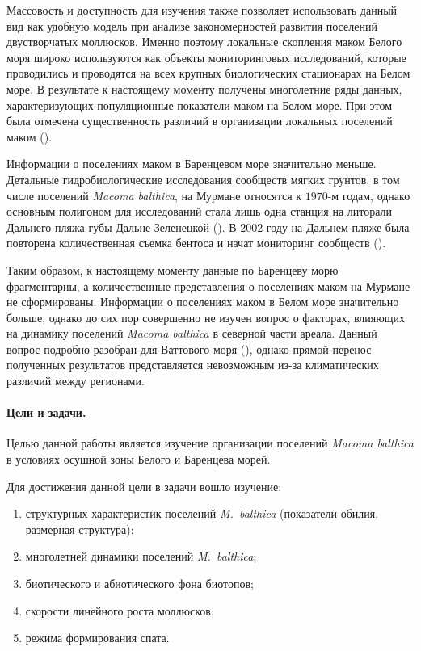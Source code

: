 Массовость и доступность для изучения также позволяет использовать данный вид как удобную модель при анализе закономерностей развития поселений двустворчатых моллюсков. 
Именно поэтому локальные скопления маком Белого моря широко используются как объекты мониторинговых исследований, которые проводились и проводятся на всех крупных биологических стационарах на Белом море. 
В результате к настоящему моменту получены многолетние ряды данных, характеризующих  популяционные показатели маком на Белом море. 
При этом была отмечена существенность различий в организации локальных поселений маком (\cite{Semenova_1974, Maximovich_Kunina_1982, Maximovich_et_al_1991, Poloskin_1996, Nikolaeva_1998, Nazarova_2003, Nazarova_Poloskin_2005}).

 
Информации о поселениях маком в Баренцевом море значительно меньше. 
Детальные гидробиологические исследования сообществ мягких грунтов, в том числе  поселений {\it Macoma balthica}, на Мурмане относятся к $1970$-м годам, однако основным полигоном для исследований стала лишь одна станция на литорали Дальнего пляжа губы Дальне-Зеленецкой (\cite{Agarova_et_al_1976}).
В $2002$ году на Дальнем пляже была повторена количественная съемка бентоса и начат мониторинг сообществ (\cite{Genelt_Dalnezeleneckaya_2008}).

Таким образом, к настоящему моменту данные по Баренцеву морю фрагментарны, а количественные представления о поселениях маком на Мурмане не сформированы. 
Информации о поселениях маком в Белом море значительно больше, однако до сих пор совершенно не изучен вопрос о факторах, влияющих на динамику поселений {\it Macoma balthica} в северной части ареала. Данный вопрос подробно разобран для Ваттового моря (\cite{Hiddink_et_al_2002_predation_epifauna, Hiddink_et_al_2002_predation_infauna, Beukema_et_al_2009}), однако прямой перенос полученных результатов представляется невозможным из-за климатических различий между регионами.


\paragraph{Цели и задачи.}
Целью данной работы является изучение организации поселений {\it Macoma balthica} в условиях осушной зоны Белого и Баренцева морей.

Для достижения данной цели в задачи вошло изучение:
  \begin{enumerate}
    \item структурных характеристик поселений \textit{M.~balthica} (показатели обилия, размерная структура);
    \item многолетней динамики поселений \textit{M.~balthica};
    \item биотического и абиотического фона биотопов;
    \item скорости линейного роста моллюсков;
    \item режима формирования спата.
  \end{enumerate}


